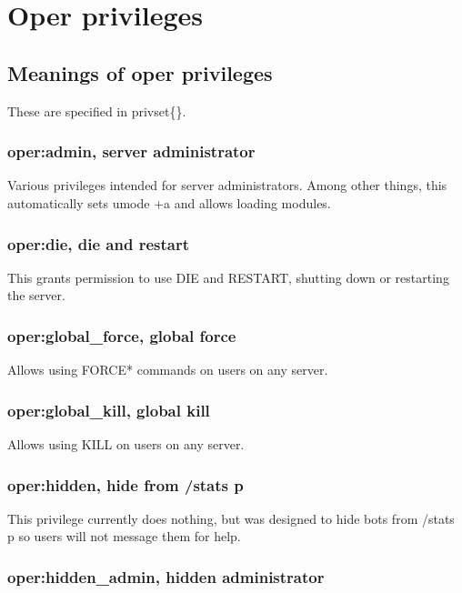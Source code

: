\chapter{Oper privileges}
\label{oprivs}

\section{Meanings of oper privileges}
\label{oprivlist}

These are specified in privset\{\}.


\subsection{oper:admin, server administrator}

	Various privileges intended for server administrators. Among other
	things, this automatically sets umode +a and allows loading modules.


\subsection{oper:die, die and restart}

	This grants permission to use DIE and RESTART, shutting down
	or restarting the server.


\subsection{oper:global\_force, global force}

	Allows using FORCE* commands on users on any server.


\subsection{oper:global\_kill, global kill}

	Allows using KILL on users on any server.


\subsection{oper:hidden, hide from /stats p}

	This privilege currently does nothing, but was designed	to hide bots
	from /stats p so users will not message them for help.


\subsection{oper:hidden\_admin, hidden administrator}

